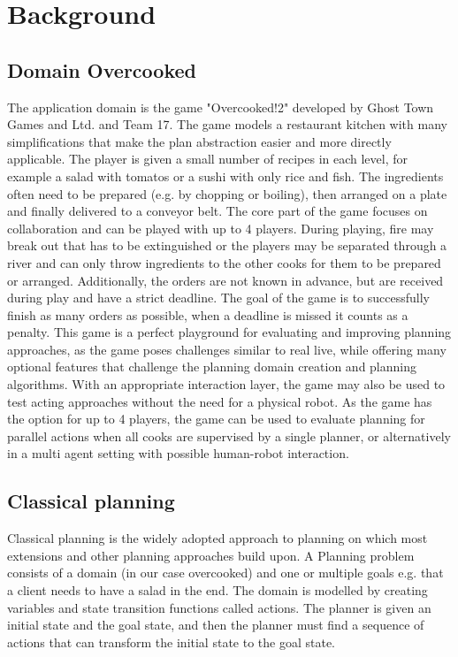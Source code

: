 \section{Background}\label{sec:background}

\subsection{Domain Overcooked}

The application domain is the game "Overcooked!2" developed by Ghost Town Games and Ltd. and Team 17.
The game models a restaurant kitchen with many simplifications that make the plan abstraction easier and more directly applicable.
The player is given a small number of recipes in each level, for example a salad with tomatos or a sushi with only rice and fish.
The ingredients often need to be prepared (e.g. by chopping or boiling), then arranged on a plate and finally delivered to a conveyor belt.
The core part of the game focuses on collaboration and can be played with up to 4 players.
During playing, fire may break out that has to be extinguished or the players may be separated through a river and can only throw ingredients to the other cooks for them to be prepared or arranged.
Additionally, the orders are not known in advance, but are received during play and have a strict deadline.
The goal of the game is to successfully finish as many orders as possible, when a deadline is missed it counts as a penalty.
This game is a perfect playground for evaluating and improving planning approaches, as the game poses challenges similar to real live, while offering many optional features that challenge the planning domain creation and planning algorithms.
With an appropriate interaction layer, the game may also be used to test acting approaches without the need for a physical robot.
As the game has the option for up to 4 players, the game can be used to evaluate planning for parallel actions when all cooks are supervised by a single planner, or alternatively in a multi agent setting with possible human-robot interaction.


\subsection{Classical planning}\label{sec:classical-planning}

Classical planning is the widely adopted approach to planning on which most extensions and other planning approaches build upon.
A Planning problem consists of a domain (in our case overcooked) and one or multiple goals e.g. that a client needs to have a salad in the end.
The domain is modelled by creating variables and state transition functions called actions.
The planner is given an initial state and the goal state, and then the planner must find a sequence of actions that can transform the initial state to the goal state.

